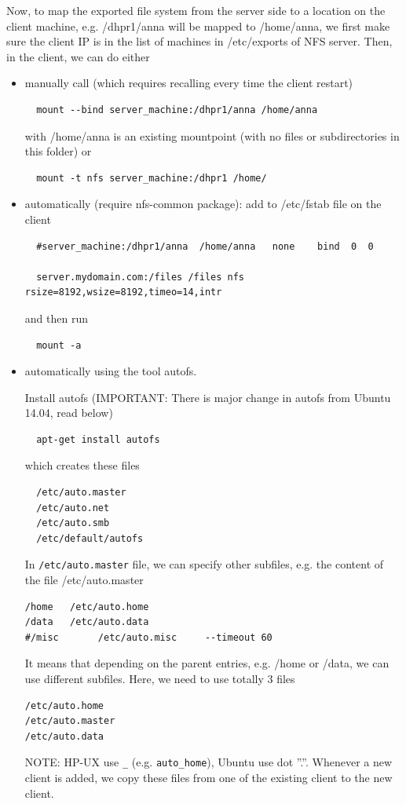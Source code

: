 Now, to map the exported file system from the server side to a location on the
client machine, e.g. /dhpr1/anna will be mapped to /home/anna, we first make
sure the client IP is in the list of machines in /etc/exports of NFS server.
Then, in the client, we can do either
\begin{itemize}
  \item manually call (which requires recalling every time the client
  restart)
  \begin{verbatim}
  mount --bind server_machine:/dhpr1/anna /home/anna  
  \end{verbatim}
  with /home/anna is an existing mountpoint (with no files or subdirectories in
  this folder)
  or
  \begin{verbatim}
  mount -t nfs server_machine:/dhpr1 /home/
  \end{verbatim}
  
  \item automatically (require nfs-common package): add to /etc/fstab file on
  the client
  \begin{verbatim}
  #server_machine:/dhpr1/anna  /home/anna  	none    bind  0  0
  
  server.mydomain.com:/files /files nfs rsize=8192,wsize=8192,timeo=14,intr
  \end{verbatim}
  and then run
  \begin{verbatim}
  mount -a
  \end{verbatim}

  \item automatically using the tool autofs.
  
  Install autofs (IMPORTANT: There is major change in autofs from Ubuntu 14.04,
  read below)
  \begin{verbatim}
  apt-get install autofs 
  \end{verbatim}
  which creates these files
  \begin{verbatim}
  /etc/auto.master
  /etc/auto.net
  /etc/auto.smb
  /etc/default/autofs
  \end{verbatim}
  
  In \verb!/etc/auto.master! file, we can specify other subfiles, e.g. the
  content of the file /etc/auto.master
\begin{verbatim}
/home   /etc/auto.home
/data   /etc/auto.data
#/misc       /etc/auto.misc     --timeout 60
\end{verbatim}
It means that depending on the parent entries, e.g. /home or /data, we can use
different subfiles. Here, we need to use totally 3 files
\begin{verbatim}
/etc/auto.home
/etc/auto.master
/etc/auto.data
\end{verbatim}
NOTE: HP-UX use \verb!_! (e.g. \verb!auto_home!), Ubuntu use dot ''.''. 
Whenever a new client is added, we copy these files from one of the existing
client to the new client.

\end{itemize}

